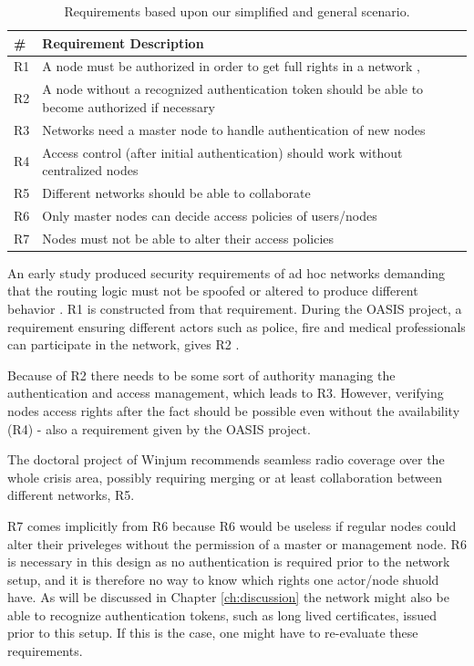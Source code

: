 \begin{table}[ht!]
	\centering
	\begin{tabular*}{\textwidth}{ | p{5mm} | p{388pt} | }
	\hline
	\textbf{\#} & \textbf{Requirement Description}\\\hline
		R1 & A node must be authorized in order to get full rights in a network \cite{dahill2001secure}, \cite{sanzgiri2002secure}\\\hline
		R2 & A node without a recognized authentication token should be able to become authorized if necessary\\\hline
		R3 & Networks need a master node to handle authentication of new nodes\\\hline
		R4 & Access control (after initial authentication) should work without centralized nodes\\\hline
		R5 & Different networks should be able to collaborate \cite{ffi_2005_04015}\\\hline
		R6 & Only master nodes can decide access policies of users/nodes\\\hline
		R7 & Nodes must not be able to alter their access policies\\\hline
	\end{tabular*}
	\caption{Requirements based upon our simplified and general scenario.}
	\label{tab:our_req}
\end{table}

An early study produced security requirements of ad hoc networks demanding
that the routing logic must not be spoofed or altered to produce different
behavior \cite{dahill2001secure}. R1 is constructed from that requirement.
During the OASIS project, a requirement ensuring different actors such as
police, fire and medical professionals can participate in the network, gives R2
\cite{5683058}.

Because of R2 there needs to be some sort of authority managing the
authentication and access management, which leads to R3. However, verifying
nodes access rights after the fact should be possible even without the
availability (R4) - also a requirement given by the OASIS project.

The doctoral project of Winjum recommends seamless radio coverage over the whole
crisis area, possibly requiring merging or at least collaboration between
different networks, R5.

R7 comes implicitly from R6 because R6 would be useless if regular nodes could
alter their priveleges without the permission of a master or management node. R6
is necessary in this design as no authentication is required prior to the
network setup, and it is therefore no way to know which rights one actor/node
shuold have. As will be discussed in Chapter \ref{ch:discussion} the network
might also be able to recognize authentication tokens, such as long lived
certificates, issued prior to this setup. If this is the case, one might have to
re-evaluate these requirements.

